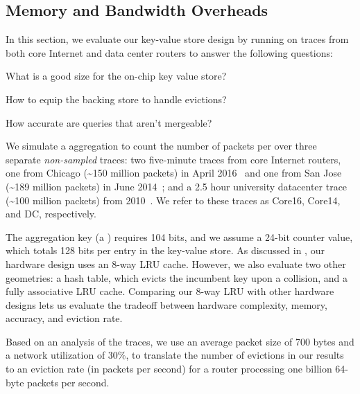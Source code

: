 \subsection{Memory and Bandwidth Overheads}
\label{s:eval:traces}
\label{sec:eval:traces}


In this section, we evaluate our key-value store design by running \TheSystem
on traces from both core Internet and data center routers to answer the
following questions:
\begin{CompactEnumerate}
\item What is a good size for the on-chip key value store?
\item How to equip the backing store to handle evictions?
\item How accurate are queries that aren't mergeable?
\end{CompactEnumerate}

  We simulate a \TheSystem aggregation to count the number of
packets per \txtftuple over three separate {\em non-sampled} traces: two
five-minute traces from core Internet routers, one from Chicago
(\textasciitilde{}150 million packets) in April 2016~\cite{caida2016} and one
from San Jose (\textasciitilde{}189 million packets) in June
2014~\cite{caida2014}; and a 2.5 hour university datacenter trace
(\textasciitilde{}100 million packets) from 2010~\cite{bensonDC}. We refer to
these traces as Core16, Core14, and DC, respectively.

The aggregation key (a \txtftuple) requires 104 bits, and we assume a 24-bit
counter value, which totals 128 bits per entry in the key-value store. As
discussed in , our hardware design uses an 8-way LRU
cache. However, we also evaluate two other geometries: a hash table, which
evicts the incumbent key upon a collision, and a fully associative LRU
cache. Comparing our 8-way LRU with other hardware designs lets us evaluate the
tradeoff between hardware complexity, memory, accuracy, and eviction rate.

Based on an analysis of the traces, we use an average packet size of 700 bytes
and a network utilization of 30\%, to translate the number of evictions in our
results to an eviction rate (in packets per second) for a router processing one
billion 64-byte packets per second.

